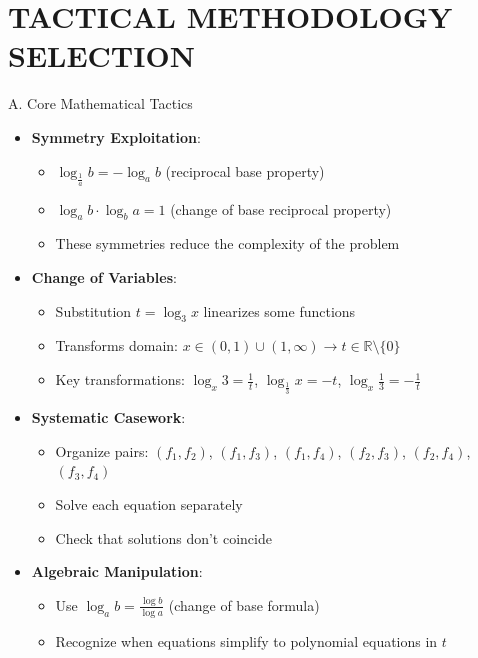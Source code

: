 \documentclass[12pt]{article}
\begin{document}
\section{TACTICAL METHODOLOGY SELECTION}

\begin{tacticalbox}{A. Core Mathematical Tactics}
\begin{itemize}[leftmargin=*]
    \item \textbf{Symmetry Exploitation}:
    \begin{itemize}
        \item $\log_{\frac{1}{a}} b = -\log_a b$ (reciprocal base property)
        \item $\log_a b \cdot \log_b a = 1$ (change of base reciprocal property)
        \item These symmetries reduce the complexity of the problem
    \end{itemize}
    
    \item \textbf{Change of Variables}:
    \begin{itemize}
        \item Substitution $t = \log_3 x$ linearizes some functions
        \item Transforms domain: $x \in (0, 1) \cup (1, \infty) \to t \in \mathbb{R} \setminus \{0\}$
        \item Key transformations: $\log_x 3 = \frac{1}{t}$, $\log_{\frac{1}{3}} x = -t$, $\log_x \frac{1}{3} = -\frac{1}{t}$
    \end{itemize}
    
    \item \textbf{Systematic Casework}:
    \begin{itemize}
        \item Organize pairs: $(f_1, f_2)$, $(f_1, f_3)$, $(f_1, f_4)$, $(f_2, f_3)$, $(f_2, f_4)$, $(f_3, f_4)$
        \item Solve each equation separately
        \item Check that solutions don't coincide
    \end{itemize}
    
    \item \textbf{Algebraic Manipulation}:
    \begin{itemize}
        \item Use $\log_a b = \frac{\log b}{\log a}$ (change of base formula)
        \item Recognize when equations simplify to polynomial equations in $t$
    \end{itemize}
\end{itemize}
\end{tacticalbox}
\end{document}
